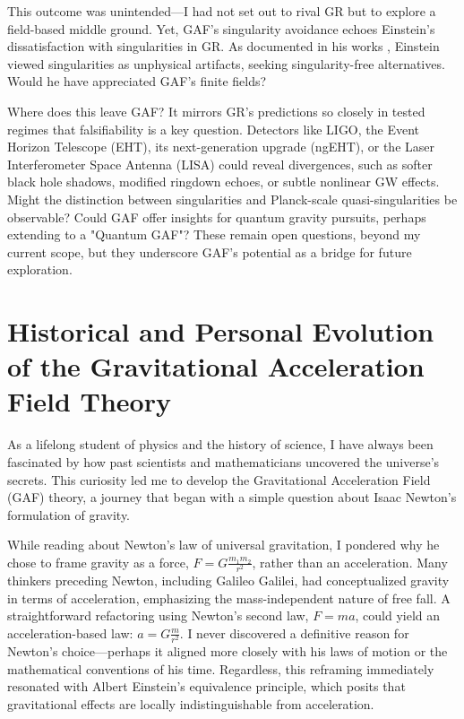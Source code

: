 \documentclass{article}
\begin{document}
This outcome was unintended—I had not set out to rival GR but to explore a field-based middle ground. Yet, GAF's singularity avoidance echoes Einstein's dissatisfaction with singularities in GR. As documented in his works \cite{EinsteinRosen1935}\cite{Einstein1939}\cite{EinsteinDeSitter1917}, Einstein viewed singularities as unphysical artifacts, seeking singularity-free alternatives. Would he have appreciated GAF's finite fields?

Where does this leave GAF? It mirrors GR's predictions so closely in tested regimes that falsifiability is a key question. Detectors like LIGO, the Event Horizon Telescope (EHT), its next-generation upgrade (ngEHT), or the Laser Interferometer Space Antenna (LISA) could reveal divergences, such as softer black hole shadows, modified ringdown echoes, or subtle nonlinear GW effects. Might the distinction between singularities and Planck-scale quasi-singularities be observable? Could GAF offer insights for quantum gravity pursuits, perhaps extending to a "Quantum GAF"? These remain open questions, beyond my current scope, but they underscore GAF's potential as a bridge for future exploration.





\newpage
\section{Historical and Personal Evolution of the Gravitational Acceleration Field Theory}

As a lifelong student of physics and the history of science, I have always been fascinated by how past scientists and mathematicians uncovered the universe's secrets. This curiosity led me to develop the Gravitational Acceleration Field (GAF) theory, a journey that began with a simple question about Isaac Newton's formulation of gravity.

While reading about Newton's law of universal gravitation, I pondered why he chose to frame gravity as a force, \( F = G \frac{m_1 m_2}{r^2} \), rather than an acceleration. Many thinkers preceding Newton, including Galileo Galilei, had conceptualized gravity in terms of acceleration, emphasizing the mass-independent nature of free fall. A straightforward refactoring using Newton's second law, \( F = m a \), could yield an acceleration-based law: \( a = G \frac{m}{r^2} \). I never discovered a definitive reason for Newton's choice—perhaps it aligned more closely with his laws of motion or the mathematical conventions of his time. Regardless, this reframing immediately resonated with Albert Einstein's equivalence principle, which posits that gravitational effects are locally indistinguishable from acceleration.
\end{document}
